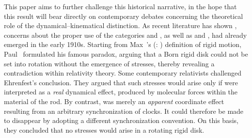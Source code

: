 \documentclass[pdflatex,sn-basic]{sn-jnl}
\renewcommand{\citets}[2][]{\citeauthor{#2}'s (\citeyear{#2}\if\relax\detokenize{#1}\relax\else: #1\fi)}
\begin{document}

This paper aims to further challenge this historical narrative, in the hope that this result will bear directly on contemporary debates concerning the theoretical role of the dynamical–kinematical distinction. As recent literature has shown \citep{Giovanelli2023a}, concerns about the proper use of the categories  and , as well as  and , had already emerged in the early 1910s. Starting from Max~\citets{Born1909} definition of rigid motion, Paul~\citet{Ehrenfest1909} formulated his famous paradox, arguing that a Born rigid disk could not be set into rotation without the emergence of stresses, thereby revealing a contradiction within relativity theory. Some contemporary relativists \citep{Ignatowski1910,Varicak1911} challenged Ehrenfest’s conclusion. They argued that such stresses would arise only if  were interpreted as a \emph{real} dynamical effect, produced by molecular forces within the material of the rod. By contrast,  was merely an \emph{apparent} coordinate effect resulting from an arbitrary synchronization of clocks. It could therefore be made to disappear by adopting a different synchronization convention. On this basis, they concluded that no stresses would arise in a rotating rigid disk. 
\end{document}
